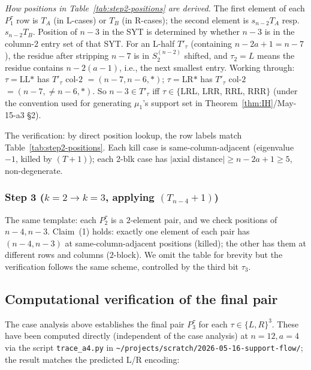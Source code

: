 \documentclass[11pt]{article}
\theoremstyle{definition}
\begin{document}
\emph{How positions in Table~\ref{tab:step2-positions} are derived.}
The first element of each $P_1^\tau$ row is $T_A$ (in L-cases) or $T_B$
(in R-cases); the second element is $s_{n-2}T_A$ resp.\ $s_{n-2}T_B$.
Position of $n-3$ in the SYT is determined by whether $n-3$ is in the
column-$2$ entry set of that SYT.  For an L-half $T'_\tau$
(containing $n-2a+1=n-7$), the residue after stripping $n-7$ is in
$S_2^{(n-2)}$ shifted, and $\tau_2=L$ means the residue contains
$n-2(a-1)$, i.e., the next smallest entry.  Working through:
$\tau=$LL$*$ has $T'_\tau$ col-$2$ $=(n-7,n-6,*)$; $\tau=$LR$*$ has
$T'_\tau$ col-$2$ $=(n-7,\ne n-6,*)$.  So $n-3\in T'_\tau$ iff
$\tau\in\{$LRL, LRR, RRL, RRR$\}$ (under the convention used for
generating $\mu_1$'s support set in
Theorem~\ref{thm:IH}/May-15-a3 \S2).

The verification: by direct position lookup, the row labels match
Table~\ref{tab:step2-positions}.  Each kill case is same-column-adjacent
(eigenvalue $-1$, killed by $(T+1)$); each 2-blk case has
$|\text{axial distance}|\ge n-2a+1\ge 5$, non-degenerate.

\subsubsection*{Step 3 ($k=2\to k=3$, applying $(T_{n-4}{+}1)$)}

The same template: each $P_2^\tau$ is a $2$-element pair, and we check
positions of $n-4,n-3$.  Claim~(1) holds: exactly one element of each
pair has $(n-4,n-3)$ at same-column-adjacent positions (killed); the
other has them at different rows and columns ($2$-block).  We omit
the table for brevity but the verification follows the same scheme,
controlled by the third bit $\tau_3$.

\subsection{Computational verification of the final pair}\label{sec:final-pair}

The case analysis above establishes the final pair $P_3^\tau$ for each
$\tau\in\{L,R\}^3$.  These have been computed directly (independent
of the case analysis) at $n=12,a=4$ via the script
\texttt{trace\_a4.py} in
\texttt{\textasciitilde/projects/scratch/2026-05-16-support-flow/};
the result matches the predicted L/R encoding:
\end{document}
